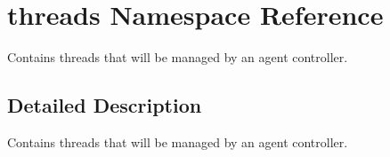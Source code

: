 \hypertarget{namespacethreads}{}\section{threads Namespace Reference}
\label{namespacethreads}


Contains threads that will be managed by an agent controller.  




\subsection{Detailed Description}
Contains threads that will be managed by an agent controller. 
